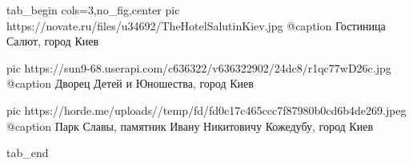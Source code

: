 \ifcmt
  tab_begin cols=3,no_fig,center
		 pic https://novate.ru/files/u34692/TheHotelSalutinKiev.jpg
		 @caption Гостиница Салют, город Киев

		 pic https://sun9-68.userapi.com/c636322/v636322902/24dc8/r1qc77wD26c.jpg
		 @caption Дворец Детей и Юношества, город Киев

		 pic https://horde.me/uploads//temp/fd/fd0c17c465ccc7f87980b0cd6b4de269.jpeg
		 @caption Парк Славы, памятник Ивану Никитовичу Кожедубу, город Киев

  tab_end
\fi


